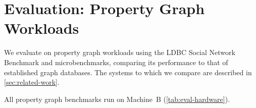 \chapter{Evaluation: Property Graph Workloads}
\label{sec:eval:property:chapter}

We evaluate \project{} on property graph workloads using the LDBC Social Network Benchmark and microbenchmarks, comparing its performance to that of  established graph databases.
The systems to which we compare are described in \autoref{sec:related-work}.


All property graph benchmarks run on Machine~B (\autoref{tab:eval-hardware}).





